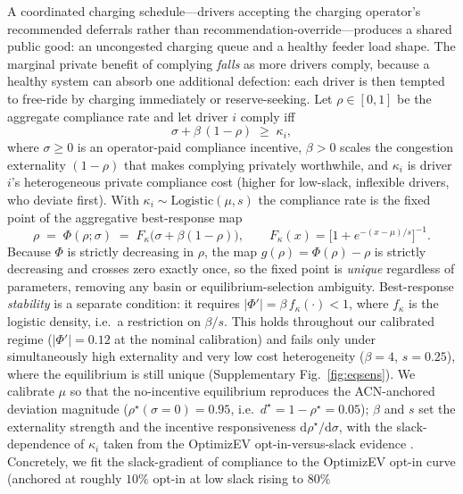 \documentclass[12pt]{article}
\begin{document}
A coordinated charging schedule---drivers accepting the charging operator's recommended deferrals
rather than recommendation-override---produces a shared public good: an uncongested charging queue
and a healthy feeder load shape. The marginal private benefit of complying \emph{falls}
as more drivers comply, because a healthy system can absorb one additional defection:
each driver is then tempted to free-ride by charging immediately or reserve-seeking. Let
$\rho\in[0,1]$ be the aggregate compliance rate and let driver $i$ comply iff
\begin{equation}
\sigma + \beta\,(1-\rho) \;\ge\; \kappa_i,
\label{eq:driverrule}
\end{equation}
where $\sigma\ge 0$ is an operator-paid compliance incentive, $\beta>0$ scales the
congestion externality $(1-\rho)$ that makes complying privately worthwhile, and
$\kappa_i$ is driver $i$'s heterogeneous private compliance cost (higher for low-slack,
inflexible drivers, who deviate first). With $\kappa_i\sim\mathrm{Logistic}(\mu,s)$ the
compliance rate is the fixed point of the aggregative best-response map
\begin{equation}
\rho \;=\; \Phi(\rho;\sigma) \;=\; F_\kappa\!\big(\sigma + \beta(1-\rho)\big),
\qquad F_\kappa(x)=\big[1+e^{-(x-\mu)/s}\big]^{-1}.
\label{eq:fixedpoint}
\end{equation}
Because $\Phi$ is strictly decreasing in $\rho$, the map $g(\rho)=\Phi(\rho)-\rho$ is
strictly decreasing and crosses zero exactly once, so the fixed point is \emph{unique}
regardless of parameters, removing any basin or equilibrium-selection ambiguity.
Best-response \emph{stability} is a separate condition: it requires
$|\Phi'|=\beta\,f_\kappa(\cdot)<1$, where $f_\kappa$ is the logistic density, i.e.\ a
restriction on $\beta/s$. This holds throughout our calibrated regime ($|\Phi'|=0.12$ at
the nominal calibration) and fails only under simultaneously high externality and very low
cost heterogeneity ($\beta=4$, $s=0.25$), where the equilibrium is still unique
(Supplementary Fig.~\ref{fig:eqsens}). We calibrate $\mu$ so that the
no-incentive equilibrium reproduces the ACN-anchored deviation magnitude
($\rho^\star(\sigma{=}0)=0.95$, i.e.\ $d^\star=1-\rho^\star=0.05$); $\beta$ and $s$ set
the externality strength and the incentive responsiveness $\mathrm{d}\rho^\star/\mathrm{d}\sigma$,
with the slack-dependence of $\kappa_i$ taken from the OptimizEV opt-in-versus-slack
evidence \cite{alexeenko2023pilot}. Concretely, we fit the slack-gradient of compliance to
the OptimizEV opt-in curve (anchored at roughly $10\%$ opt-in at low slack rising to $80\%$
\end{document}
